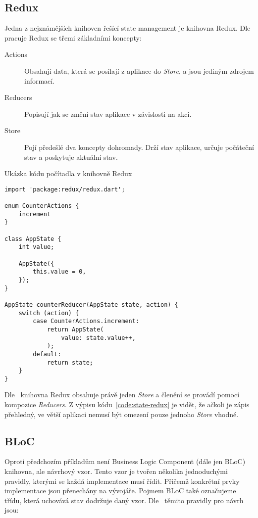 \subsection{Redux}

Jedna z nejznámějších knihoven řešící state management je knihovna Redux.
Dle~\cite{redux_basics} pracuje Redux se třemi základními koncepty:

\begin{description}
    \item[Actions] Obsahují data,
    která se posílají z aplikace do \emph{Store},
    a jsou jediným zdrojem informací.
    \item[Reducers] Popisují jak se změní stav aplikace v závislosti na akci.
    \item[Store] Pojí předešlé dva koncepty dohromady.
    Drží stav aplikace,
    určuje počáteční stav
    a poskytuje aktuální stav.
\end{description}

\begin{listing}
    \caption{Ukázka kódu počítadla v knihovně Redux~\cite{redux_basics}}
    \label{code:state-redux}
    \begin{verbatim}
import 'package:redux/redux.dart';

enum CounterActions {
    increment
}

class AppState {
    int value;

    AppState({ 
        this.value = 0,
    });
}

AppState counterReducer(AppState state, action) {
    switch (action) {
        case CounterActions.increment:
            return AppState(
                value: state.value++,
            );
        default:
            return state;
    }
}
    \end{verbatim}
\end{listing}

Dle~\cite{redux_basics} knihovna Redux obsahuje právě jeden \emph{Store}
a členění se provádí pomocí kompozice \emph{Reducers}.
Z výpisu kódu~\ref{code:state-redux} je vidět,
že ačkoli je zápis přehledný,
ve větší aplikaci nemusí být omezení pouze jednoho \emph{Store} vhodné.

\subsection{BLoC}

Oproti předchozím příkladům není Business Logic Component (dále jen BLoC)
knihovna,
ale návrhový vzor.
Tento vzor je tvořen několika jednoduchými pravidly,
kterými se každá implementace musí řídit.
Přičemž konkrétní prvky implementace jsou přenechány na vývojáře.
Pojmem BLoC také označujeme třídu,
která uchovává stav dodržuje daný vzor. 
Dle~\cite{googledevelopers_bloc} těmito pravidly pro návrh jsou:

